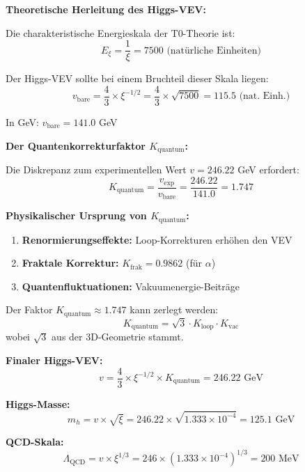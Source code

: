 \documentclass[12pt,a4paper]{article}
\newcommand{\xipar}{\xi}
\newcommand{\Kquantum}{K_{\text{quantum}}}
\begin{document}
	\begin{keyresult}
		\textbf{Theoretische Herleitung des Higgs-VEV:}
		
		Die charakteristische Energieskala der T0-Theorie ist:
		\begin{equation}
			E_\xipar = \frac{1}{\xipar} = 7500 \text{ (natürliche Einheiten)}
		\end{equation}
		
		Der Higgs-VEV sollte bei einem Bruchteil dieser Skala liegen:
		\begin{equation}
			v_{\text{bare}} = \frac{4}{3} \times \xipar^{-1/2} = \frac{4}{3} \times \sqrt{7500} = 115.5 \text{ (nat. Einh.)}
		\end{equation}
		
		In GeV: $v_{\text{bare}} = 141.0$ GeV
		
		\textbf{Der Quantenkorrekturfaktor $\Kquantum$:}
		
		Die Diskrepanz zum experimentellen Wert $v = 246.22$ GeV erfordert:
		\begin{equation}
			\Kquantum = \frac{v_{\text{exp}}}{v_{\text{bare}}} = \frac{246.22}{141.0} = 1.747
		\end{equation}
		
		\textbf{Physikalischer Ursprung von $\Kquantum$:}
		\begin{enumerate}
			\item \textbf{Renormierungseffekte:} Loop-Korrekturen erhöhen den VEV
			\item \textbf{Fraktale Korrektur:} $K_{\text{frak}} = 0.9862$ (für $\alpha$)
			\item \textbf{Quantenfluktuationen:} Vakuumenergie-Beiträge
		\end{enumerate}
		
		Der Faktor $\Kquantum \approx 1.747$ kann zerlegt werden:
		\begin{equation}
			\Kquantum = \sqrt{3} \cdot K_{\text{loop}} \cdot K_{\text{vac}}
		\end{equation}
		wobei $\sqrt{3}$ aus der 3D-Geometrie stammt.
	\end{keyresult}
	
	\begin{secondary}
		\textbf{Finaler Higgs-VEV:}
		\begin{equation}
			\boxed{v = \frac{4}{3} \times \xipar^{-1/2} \times \Kquantum = 246.22 \text{ GeV}}
		\end{equation}
		
		\textbf{Higgs-Masse:}
		\begin{equation}
			m_h = v \times \sqrt{\xipar} = 246.22 \times \sqrt{1.333 \times 10^{-4}} = 125.1 \text{ GeV}
		\end{equation}
		
		\textbf{QCD-Skala:}
		\begin{equation}
			\Lambda_{\text{QCD}} = v \times \xipar^{1/3} = 246 \times (1.333 \times 10^{-4})^{1/3} = 200 \text{ MeV}
		\end{equation}
	\end{secondary}
	
\end{document}
